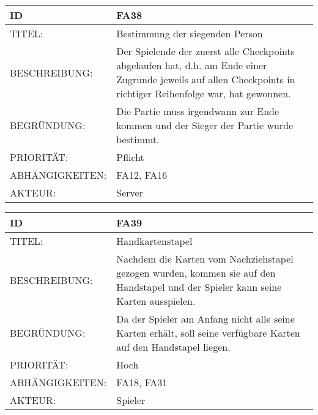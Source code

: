 \documentclass{uulm-assignment}
\begin{document}
    \begin{tabularx}{\textwidth}{|l|X |} \hline
        \textbf{ID} & \textbf{FA38} \\
        \hline
        TITEL: & Bestimmung der siegenden Person \\
        \hline
        BESCHREIBUNG: & Der Spielende der zuerst alle Checkpoints abgelaufen hat, d.h. am Ende einer Zugrunde jeweils auf
allen Checkpoints in richtiger Reihenfolge war, hat gewonnen.
        \\
        \hline
        BEGRÜNDUNG: & Die Partie muss irgendwann zur Ende kommen und der Sieger der Partie wurde bestimmt.\\
        \hline
        PRIORITÄT: & Pflicht\\
        \hline
        ABHÄNGIGKEITEN: & FA12, FA16 \\
        \hline
        AKTEUR: & Server\\
        \hline
    \end{tabularx}
   
    
    \begin{tabularx}{\textwidth}{|l|X |} \hline
        \textbf{ID} & \textbf{FA39} \\
        \hline
        TITEL: & Handkartenstapel\\
        \hline
        BESCHREIBUNG: & Nachdem die Karten vom Nachziehstapel gezogen wurden, kommen sie auf den Handstapel und der Spieler kann seine Karten ausspielen.
        \\
        \hline
        BEGRÜNDUNG: & Da der Spieler am Anfang nicht alle seine Karten erhält, soll seine verfügbare Karten auf den Handstapel liegen. \\
        \hline
        PRIORITÄT: & Hoch\\
        \hline
        ABHÄNGIGKEITEN: & FA18, FA31\\
        \hline
        AKTEUR: & Spieler\\
        \hline
    \end{tabularx}
    
\end{document}
